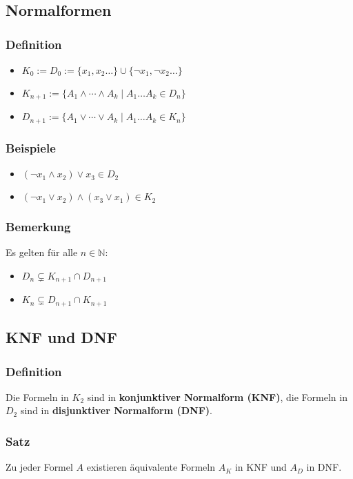 \subsection{Normalformen}
\subsubsection{Definition}
\begin{itemize}
\item $K_0 := D_0 := \{x_1, x_2 \ldots \} \cup \{\neg x_1, \neg x_2 \ldots \}$
\item $K_{n+1} := \{A_1 \wedge \cdots \wedge A_k \mid A_1 \ldots A_k \in D_n\}$
\item $D_{n+1} := \{A_1 \vee \cdots \vee A_k \mid A_1 \ldots A_k \in K_n\}$
\end{itemize}

\subsubsection{Beispiele}
\begin{itemize}
\item $(\neg x_1 \wedge x_2) \vee x_3 \in D_2$
\item $(\neg x_1 \vee x_2) \wedge (x_3 \vee x_1) \in K_2$
\end{itemize}

\subsubsection{Bemerkung}
Es gelten für alle $n \in \mathbb{N}$:
\begin{itemize}
\item $D_n \subsetneq K_{n+1} \cap D_{n+1}$
\item $K_n \subsetneq D_{n+1} \cap K_{n+1}$
\end{itemize}
\subsection{KNF und DNF}
\subsubsection{Definition}
Die Formeln in $K_2$ sind in \textbf{konjunktiver Normalform (KNF)}, die
Formeln in $D_2$ sind in \textbf{disjunktiver Normalform (DNF)}.
\subsubsection{Satz}
Zu jeder Formel $A$ existieren äquivalente Formeln $A_K$ in KNF und
$A_D$ in DNF.
